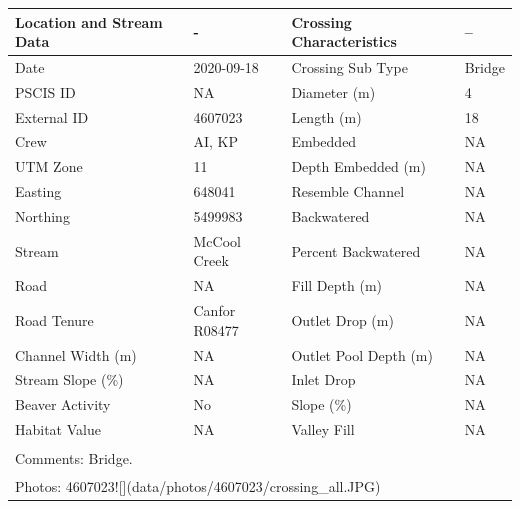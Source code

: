 \documentclass[
]{book}
\begin{document}
\begin{tabular}{l|l|l|l}
\hline
Location and Stream Data & - & Crossing Characteristics & --\\
\hline
Date & 2020-09-18 & Crossing Sub Type & Bridge\\
\hline
PSCIS ID & NA & Diameter (m) & 4\\
\hline
External ID & 4607023 & Length (m) & 18\\
\hline
Crew & AI, KP & Embedded & NA\\
\hline
UTM Zone & 11 & Depth Embedded (m) & NA\\
\hline
Easting & 648041 & Resemble Channel & NA\\
\hline
Northing & 5499983 & Backwatered & NA\\
\hline
Stream & McCool Creek & Percent Backwatered & NA\\
\hline
Road & NA & Fill Depth (m) & NA\\
\hline
Road Tenure & Canfor R08477 & Outlet Drop (m) & NA\\
\hline
Channel Width (m) & NA & Outlet Pool Depth (m) & NA\\
\hline
Stream Slope (\%) & NA & Inlet Drop & NA\\
\hline
Beaver Activity & No & Slope (\%) & NA\\
\hline
Habitat Value & NA & Valley Fill & NA\\
\hline
\multicolumn{4}{l}{\textsuperscript{} Comments: Bridge.}\\
\multicolumn{4}{l}{\textsuperscript{} Photos: 4607023![](data/photos/4607023/crossing\_all.JPG)}\\
\end{tabular}
\end{document}
